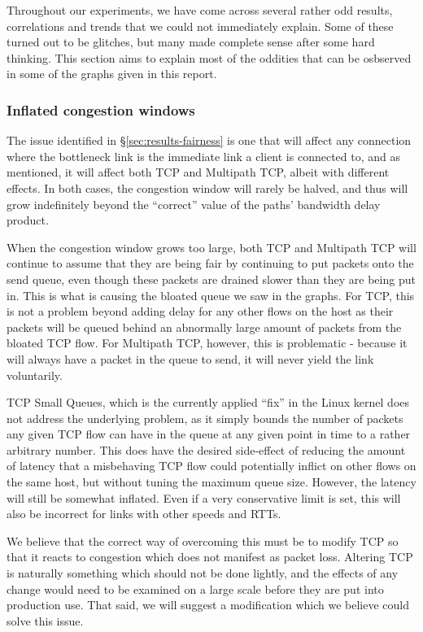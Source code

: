 Throughout our experiments, we have come across several rather odd results,
correlations and trends that we could not immediately explain. Some of these
turned out to be glitches, but many made complete sense after some hard
thinking. This section aims to explain most of the oddities that can be osbserved
in some of the graphs given in this report.

\subsubsection{Inflated congestion windows}
\label{sec:closing:inflated:cwnd}
The issue identified in \S\ref{sec:results-fairness} is one that will affect any
connection where the bottleneck link is the immediate link a client is connected
to, and as mentioned, it will affect both TCP and Multipath TCP, albeit with
different effects. In both cases, the congestion window will rarely be halved,
and thus will grow indefinitely beyond the ``correct'' value of the paths'
bandwidth delay product.

When the congestion window grows too large, both TCP and Multipath TCP will
continue to assume that they are being fair by continuing to put packets onto
the send queue, even though these packets are drained slower than they are being
put in. This is what is causing the bloated queue we saw in the graphs. For TCP,
this is not a problem beyond adding delay for any other flows on the host as
their packets will be queued behind an abnormally large amount of packets from
the bloated TCP flow. For Multipath TCP, however, this is problematic - because
it will always have a packet in the queue to send, it will never yield the link
voluntarily.

TCP Small Queues, which is the currently applied ``fix'' in the Linux kernel
does not address the underlying problem, as it simply bounds the number of
packets any given TCP flow can have in the queue at any given point in time to a
rather arbitrary number. This does have the desired side-effect of reducing the
amount of latency that a misbehaving TCP flow could potentially inflict on
other flows on the same host, but without tuning the maximum queue size. However,
the latency will
still be somewhat inflated. Even if a very conservative
limit is set, this will also be incorrect for links with other
speeds and RTTs.

We believe that the correct way of overcoming this must be to modify TCP so that it
reacts to congestion which does not manifest as packet loss. Altering TCP is naturally
something which should not
be done lightly, and the effects of any change would need to be examined
on a large scale before they are put into production use. That said, we will suggest
a modification which we believe could solve this issue.

